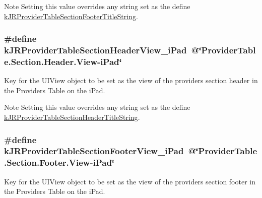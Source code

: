 \begin{DoxyNote}{Note}
Setting this value overrides any string set as the define \hyperlink{group__custom_interface_ga72e63105251e7d4d6a363e279c2bf775}{kJRProviderTableSectionFooterTitleString}. 
\end{DoxyNote}
\hypertarget{group__custom_interface_ga7dcb3488390fabe1f3a358fb5af1e42c}{
\subsubsection[{kJRProviderTableSectionHeaderView\_\-iPad}]{\setlength{\rightskip}{0pt plus 5cm}\#define kJRProviderTableSectionHeaderView\_\-iPad~@\char`\"{}ProviderTable.Section.Header.View-\/iPad\char`\"{}}}
\label{group__custom_interface_ga7dcb3488390fabe1f3a358fb5af1e42c}
Key for the {\ttfamily UIView} object to be set as the view of the providers section header in the Providers Table on the iPad.

\begin{DoxyNote}{Note}
Setting this value overrides any string set as the define \hyperlink{group__custom_interface_ga667a6c955993ec24292875f319a7d763}{kJRProviderTableSectionHeaderTitleString}. 
\end{DoxyNote}
\hypertarget{group__custom_interface_gaa2196cc44d4e0dc4de9e98248c8a7e10}{
\subsubsection[{kJRProviderTableSectionFooterView\_\-iPad}]{\setlength{\rightskip}{0pt plus 5cm}\#define kJRProviderTableSectionFooterView\_\-iPad~@\char`\"{}ProviderTable.Section.Footer.View-\/iPad\char`\"{}}}
\label{group__custom_interface_gaa2196cc44d4e0dc4de9e98248c8a7e10}
Key for the {\ttfamily UIView} object to be set as the view of the providers section footer in the Providers Table on the iPad.

